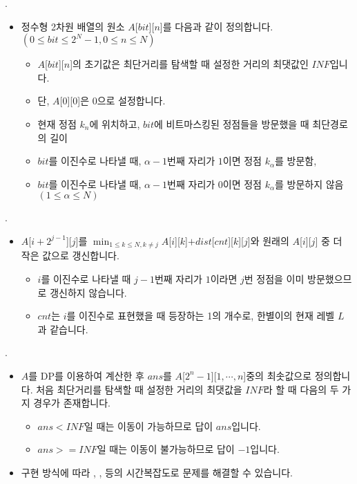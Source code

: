 	\begin{frame}{\textbf{\probidx}. \probname}
		\begin{itemize}
			\item 정수형 2차원 배열의 원소 $A$[$bit$][$n$]를 다음과 같이 정의합니다. $(0 \leq bit \leq 2^N-1, 0 \leq n \leq N)$
			\begin{itemize}
				\item $A$[$bit$][$n$]의 초기값은 최단거리를 탐색할 때 설정한 거리의 최댓값인 $INF$입니다.
				\item 단, $A$[$0$][$0$]은 $0$으로 설정합니다.
				\item 현재 정점 $k_n$에 위치하고, $bit$에 비트마스킹된 정점들을 방문했을 때 최단경로의 길이
				\item $bit$를 이진수로 나타낼 때, $\alpha-1$번째 자리가 $1$이면 정점 $k_\alpha$를 방문함,
				\item $bit$를 이진수로 나타낼 때, $\alpha-1$번째 자리가 $0$이면 정점 $k_\alpha$를 방문하지 않음 $(1 \leq \alpha \leq N)$
			\end{itemize}
		\end{itemize}
	\end{frame}
	
	\begin{frame}{\textbf{\probidx}. \probname}
		\begin{itemize}
			\item $A$[$i+2^{j-1}$][$j$]를 $\min_{1\leq k\leq N, k\neq j} A$[$i$][$k$]$+dist$[$cnt$][$k$][$j$]와 원래의 $A$[$i$][$j$] 중 더 작은 값으로 갱신합니다.
			\begin{itemize}
				\item $i$를 이진수로 나타낼 때 $j-1$번째 자리가 $1$이라면 $j$번 정점을 이미 방문했으므로 갱신하지 않습니다.
				\item $cnt$는 $i$를 이진수로 표현했을 때 등장하는 1의 개수로, 한별이의 현재 레벨 $L$과 같습니다.
			\end{itemize}
		\end{itemize}
	\end{frame}
	
	\begin{frame}{\textbf{\probidx}. \probname}
		\begin{itemize}
			\item $A$를 DP를 이용하여 계산한 후 $ans$를 $A$[$2^n-1$][$1,\cdots ,n$]중의 최솟값으로 정의합니다. 처음 최단거리를 탐색할 때 설정한 거리의 최댓값을 $INF$라 할 때 다음의 두 가지 경우가 존재합니다.
			\begin{itemize}
				\item $ans<INF$일 때는 이동이 가능하므로 답이 $ans$입니다.
				\item $ans>=INF$일 때는 이동이 불가능하므로 답이 $-1$입니다.
			\end{itemize}
			\item 구현 방식에 따라 , ,  등의 시간복잡도로 문제를 해결할 수 있습니다.
		\end{itemize}
	\end{frame}
	

